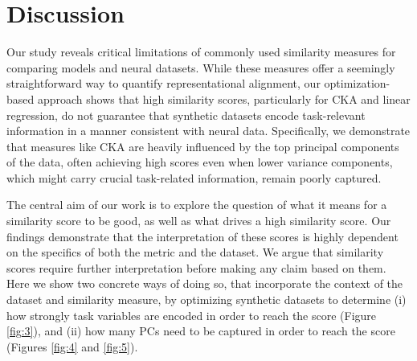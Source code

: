 \documentclass{article} %
\def\myspaceaftersections{\vspace{-0.2cm}}%
\begin{document}
\section{Discussion} \label{discussion} \myspaceaftersections
Our study reveals critical limitations of commonly used similarity measures for comparing models and neural datasets. While these measures offer a seemingly straightforward way to quantify representational alignment, our optimization-based approach shows that high similarity scores, particularly for CKA and linear regression, do not guarantee that synthetic datasets encode task-relevant information in a manner consistent with neural data. Specifically, we demonstrate that measures like CKA are heavily influenced by the top principal components of the data, often achieving high scores even when lower variance components, which might carry crucial task-related information, remain poorly captured.

The central aim of our work is to explore the question of what it means for a similarity score to be good, as well as what drives a high similarity score. Our findings demonstrate that the interpretation of these scores is highly dependent on the specifics of both the metric and the dataset. We argue that similarity scores require further interpretation before making any claim based on them. Here we show two concrete ways of doing so, that incorporate the context of the dataset and similarity measure, by optimizing synthetic datasets to determine (i) how strongly task variables are encoded in order to reach the score (Figure \ref{fig:3}), and (ii) how many PCs need to be captured in order to reach the score (Figures \ref{fig:4} and \ref{fig:5}).


\end{document}
